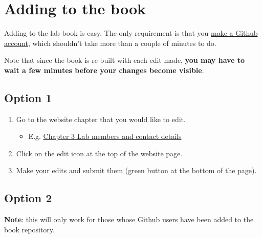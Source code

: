 \documentclass[
]{book}
\providecommand{\tightlist}{%
  \setlength{\itemsep}{0pt}\setlength{\parskip}{0pt}}
\begin{document}
\hypertarget{adding-to-the-book}{%
\section{Adding to the book}\label{adding-to-the-book}}

Adding to the lab book is easy. The only requirement is that you \href{https://github.com/join?source=header-home}{make a Github account}, which shouldn't take more than a couple of minutes to do.

Note that since the book is re-built with each edit made, \textbf{you may have to wait a few minutes before your changes become visible}.

\hypertarget{option-1}{%
\subsection{Option 1}\label{option-1}}

\begin{enumerate}
\def\labelenumi{\arabic{enumi}.}
\tightlist
\item
  Go to the website chapter that you would like to edit.

  \begin{itemize}
  \tightlist
  \item
    E.g. \href{https://tiroshlab.github.io/lab-book/contact.html}{Chapter 3 Lab members and contact details}
  \end{itemize}
\item
  Click on the edit icon at the top of the website page.
\item
  Make your edits and submit them (green button at the bottom of the page).
\end{enumerate}

\hypertarget{option-2}{%
\subsection{Option 2}\label{option-2}}

\textbf{Note}: this will only work for those whose Github users have been added to the book repository.
\end{document}
